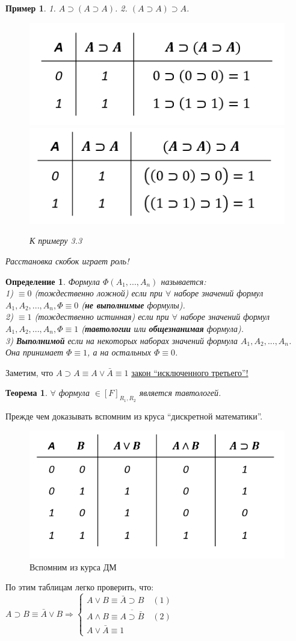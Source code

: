 \documentclass{article}
\newtheorem{example}{Пример}
\newtheorem{theorem}{Теорема}
\newtheorem{definition}{Определение}
\numberwithin{example}{section}
\numberwithin{question}{section}
\numberwithin{Remark}{section}
\numberwithin{theorem}{section}
\numberwithin{definition}{section}
\numberwithin{proposition}{section}
\begin{document}
\begin{example}
	1. $A\supset (A\supset A)$.	2. $(A\supset A)\supset A$.\\
	\begin{figure}[!htp]
		\centering
		\includegraphics[width=0.4\linewidth]{3-3}
		\label{fig:3-3}
		\includegraphics[width=0.4\linewidth]{3-4}
		\label{fig:3-4}
		\caption{К примеру 3.3}
	\end{figure}	
	Расстановка скобок играет роль!
\end{example}
\begin{definition}
Формула $\Phi(A_1,...,A_n)$ называется:\\
	1) $\equiv 0$ (тождественно ложной) если при $\forall$ наборе значений формул $A_1,A_2,...,A_n, \Phi\equiv 0$ (\textbf{не выполнимые} формулы).\\
	2) $\equiv 1$ (тождественно истинная) если при $\forall$ наборе значений формул $A_1,A_2,...,A_n, \Phi\equiv 1$ (\textbf{тавтологии} или \textbf{общезнанимая} формула).\\
	3) \textbf{Выполнимой} если на некоторых наборах значений формула $A_1,A_2,...,A_n$. Она принимает $\Phi\equiv 1$, а на остальных $\Phi\equiv 0$.
\end{definition}
	Заметим, что $A\supset A\equiv A\lor \bar{A}\equiv 1$ \underline{закон ``исключенного третьего''!}
\begin{theorem}
    \label{theorem 2-1}
	$\forall$ формула $\in [F]_{R_1,R_2}$ является тавтологей.
\end{theorem}
Прежде чем доказывать вспомним из круса ``дискретной математики''.\\
\begin{figure}[!htpb]
	\centering
	\includegraphics[width=0.4\linewidth]{3-5}
	\caption{Вспомним из курса ДМ}
	\label{fig:3-5}
\end{figure}
По этим таблицам легко проверить, что:\\
$A\supset B\equiv \bar{A}\lor B\Rightarrow \left\{\begin{array}{cc}
{A\lor B}\equiv \bar{A}\supset B \quad (1)\\
{A\land B}\equiv \overline{A\supset \bar{B}} \quad (2)\\
A\lor \bar{A}\equiv 1
\end{array}\right.$ 
\end{document}
